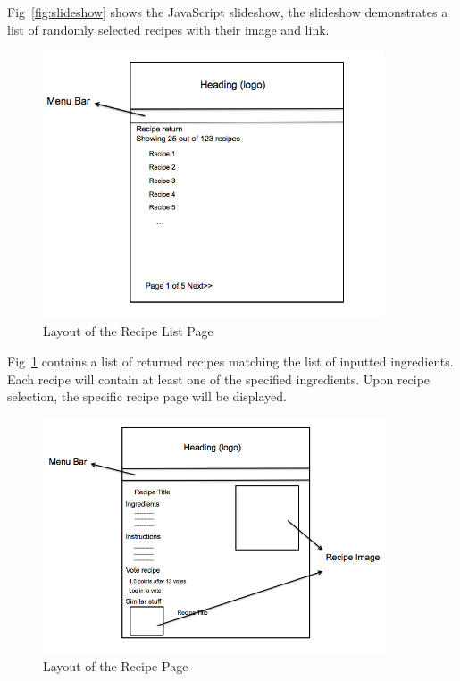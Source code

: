 Fig~\ref{fig:slideshow} shows the JavaScript slideshow, the slideshow demonstrates a list of randomly selected recipes with their image and link.  

\begin{figure}[H]
\begin{center}
\includegraphics[width=0.9\textwidth]{result_list_v2}
\caption{Layout of the Recipe List Page}
\label{fig:recipelistv2}
\end{center}
\end{figure}

Fig~\ref{fig:recipelistv2} contains a list of returned recipes matching the list of inputted ingredients. Each recipe will contain at least one of the specified ingredients. Upon recipe selection, the specific recipe page will be displayed.  

\begin{figure}[H]
\begin{center}
\includegraphics[width=0.9\textwidth]{recipe_page_v2}
\caption{Layout of the Recipe Page}
\label{fig:recipepagev2}
\end{center}
\end{figure}

